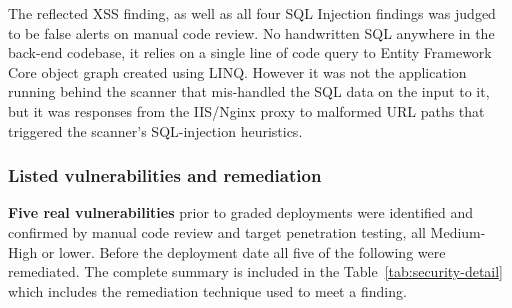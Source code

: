 \noindent The reflected XSS finding, as well as all four SQL Injection findings was judged to be false alerts on manual code review. No handwritten SQL anywhere in the back-end codebase, it relies on a single line of code query to Entity Framework Core object graph created using LINQ. However it was not the application running behind the scanner that mis-handled the SQL data on the input to it, but it was responses from the IIS/Nginx proxy to malformed URL paths that triggered the scanner's SQL-injection heuristics.

\subsubsection{Listed vulnerabilities and remediation}

\textbf{Five real vulnerabilities} prior to graded deployments were identified and confirmed by manual code review and target penetration testing, all Medium-High or lower. Before the deployment date all five of the following were remediated. The complete summary is included in the Table~\ref{tab:security-detail} which includes the remediation technique used to meet a finding.

